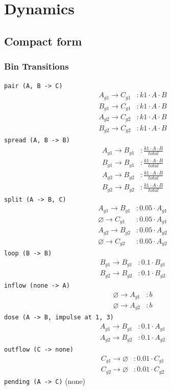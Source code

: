 \documentclass{article}
\begin{document}
\section*{Dynamics}
\subsection*{Compact form}
\subsubsection*{Bin Transitions}
\noindent\texttt{pair (A, B -\textgreater{} C)}
\begin{align*}
A_{g1} \to C_{g1} &: k1 \cdot A \cdot B \\
B_{g1} \to C_{g1} &: k1 \cdot A \cdot B \\
A_{g2} \to C_{g2} &: k1 \cdot A \cdot B \\
B_{g2} \to C_{g2} &: k1 \cdot A \cdot B
\end{align*}
\noindent\texttt{spread (A, B -\textgreater{} B)}
\begin{align*}
A_{g1} \to B_{g1} &: \frac{k1 \cdot A \cdot B}{total} \\
B_{g1} \to B_{g1} &: \frac{k1 \cdot A \cdot B}{total} \\
A_{g2} \to B_{g2} &: \frac{k1 \cdot A \cdot B}{total} \\
B_{g2} \to B_{g2} &: \frac{k1 \cdot A \cdot B}{total}
\end{align*}
\noindent\texttt{split (A -\textgreater{} B, C)}
\begin{align*}
A_{g1} \to B_{g1} &: 0.05 \cdot A_{g1} \\
\varnothing \to C_{g1} &: 0.05 \cdot A_{g1} \\
A_{g2} \to B_{g2} &: 0.05 \cdot A_{g2} \\
\varnothing \to C_{g2} &: 0.05 \cdot A_{g2}
\end{align*}
\noindent\texttt{loop (B -\textgreater{} B)}
\begin{align*}
B_{g1} \to B_{g1} &: 0.1 \cdot B_{g1} \\
B_{g2} \to B_{g2} &: 0.1 \cdot B_{g2}
\end{align*}
\noindent\texttt{inflow (none -\textgreater{} A)}
\begin{align*}
\varnothing \to A_{g1} &: b \\
\varnothing \to A_{g2} &: b
\end{align*}
\noindent\texttt{dose (A -\textgreater{} B, impulse at 1, 3)}
\begin{align*}
A_{g1} \to B_{g1} &: 0.1 \cdot A_{g1} \\
A_{g2} \to B_{g2} &: 0.1 \cdot A_{g2}
\end{align*}
\noindent\texttt{outflow (C -\textgreater{} none)}
\begin{align*}
C_{g1} \to \varnothing &: 0.01 \cdot C_{g1} \\
C_{g2} \to \varnothing &: 0.01 \cdot C_{g2}
\end{align*}
\noindent\texttt{pending (A -\textgreater{} C)}
(none)
\end{document}
